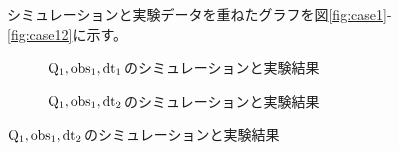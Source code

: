 \documentclass[a4j,11pt,twoside]{ujbook}
\begin{document}
\begin{figure}[htbp]
\begin{center}
		シミュレーションと実験データを重ねたグラフを図\ref{fig:case1}-\ref{fig:case12}に示す。
		
		\begin{figure}[htbp]
			\centering
			\hspace{5mm}
			\caption{${\rm Q_1,obs_1,dt_1}$のシミュレーションと実験結果}\label{case1}
		\end{figure}
		
		
		\begin{figure}[htbp]
			\centering
			\hspace{5mm}
			\caption{${\rm Q_1,obs_1,dt_2}$のシミュレーションと実験結果}\label{case2}
		\end{figure}
		

\end{center}
\end{figure}
\end{document}
